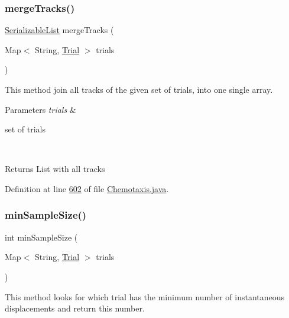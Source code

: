 \subsubsection{\texorpdfstring{merge\+Tracks()}{mergeTracks()}}
{\footnotesize\ttfamily \hyperlink{classdata_1_1_serializable_list}{Serializable\+List} merge\+Tracks (\begin{DoxyParamCaption}\item[{Map$<$ String, \hyperlink{classdata_1_1_trial}{Trial} $>$}]{trials }\end{DoxyParamCaption})\hspace{0.3cm}{\ttfamily [private]}}

This method join all tracks of the given set of trials, into one single array.


\begin{DoxyParams}{Parameters}
{\em trials} & 
\begin{DoxyItemize}
\item set of trials 
\end{DoxyItemize}\\
\hline
\end{DoxyParams}
\begin{DoxyReturn}{Returns}
List with all tracks 
\end{DoxyReturn}


Definition at line \hyperlink{_chemotaxis_8java_source_l00602}{602} of file \hyperlink{_chemotaxis_8java_source}{Chemotaxis.\+java}.

\hypertarget{classanalysis_1_1_chemotaxis_a3ae63569c841ffc6aa09be276f526c03}{}\label{classanalysis_1_1_chemotaxis_a3ae63569c841ffc6aa09be276f526c03} 
\subsubsection{\texorpdfstring{min\+Sample\+Size()}{minSampleSize()}}
{\footnotesize\ttfamily int min\+Sample\+Size (\begin{DoxyParamCaption}\item[{Map$<$ String, \hyperlink{classdata_1_1_trial}{Trial} $>$}]{trials }\end{DoxyParamCaption})\hspace{0.3cm}{\ttfamily [private]}}

This method looks for which trial has the minimum number of instantaneous displacements and return this number.


